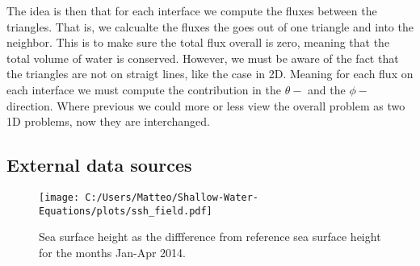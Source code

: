 The idea is then that for each interface we compute the fluxes between the triangles.
That is, we calcualte the fluxes the goes out of one triangle and into the neighbor.
This is to make sure the total flux overall is zero, meaning that the total volume of water is conserved.
However, we must be aware of the fact that the triangles are not on straigt lines, like the case in 2D. 
Meaning for each flux on each interface we must compute the contribution in the $\theta-$ and the $\phi-$direction.
Where previous we could more or less view the overall problem as two 1D problems, now they are interchanged.




\subsection*{External data sources}


\begin{figure}[H]
    \centering
    \texttt{[image: C:/Users/Matteo/Shallow-Water-Equations/plots/ssh\_field.pdf]}
    \caption{Sea surface height as the diffference from reference sea surface height for the months Jan-Apr 2014.}\label{fig:copernices-ssh}
\end{figure}


